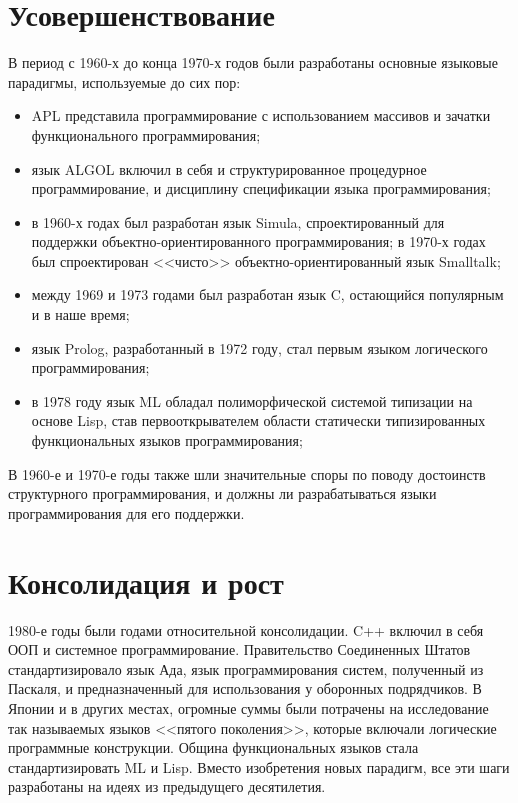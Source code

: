 \section{Усовершенствование}
В период с 1960-х до конца 1970-х годов были разработаны основные языковые
парадигмы, используемые до сих пор:
\begin{itemize}
  \item APL представила программирование с использованием массивов и зачатки
    функционального программирования;
  \item язык ALGOL включил в себя и структурированное процедурное
    программирование, и дисциплину спецификации языка программирования;
  \item в 1960-х годах был разработан язык Simula, спроектированный для
    поддержки объектно-ориентированного программирования; в 1970-х годах
    был спроектирован <<чисто>> объектно-ориентированный язык Smalltalk;
  \item между 1969 и 1973 годами был разработан язык C, остающийся популярным
    и в наше время;
  \item язык Prolog, разработанный в 1972 году, стал первым языком логического
    программирования;
  \item в 1978 году язык ML обладал полиморфической системой типизации на
    основе Lisp, став первооткрывателем области статически типизированных
    функциональных языков программирования;
\end{itemize}

В 1960-е и 1970-е годы также шли значительные споры по поводу достоинств
структурного программирования, и должны ли разрабатываться языки
программирования для его поддержки.

\section{Консолидация и рост}
1980-е годы были годами относительной консолидации. C++ включил в себя ООП и
системное программирование. Правительство Соединенных Штатов стандартизировало
язык Ада, язык программирования систем, полученный из Паскаля, и
предназначенный для использования у оборонных подрядчиков. В Японии и в других
местах, огромные суммы были потрачены на исследование так называемых языков
<<пятого поколения>>, которые включали логические программные конструкции.
Община функциональных языков стала стандартизировать ML и Lisp. Вместо
изобретения новых парадигм, все эти шаги разработаны на идеях из предыдущего
десятилетия.


